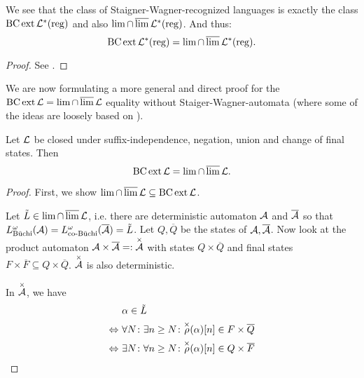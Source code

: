 \begin{theorem}
\label{thm:staiger-wagner}
We see that the class of Staigner-Wagner-recognized languages is exactly the class $\operatorname{BC} \operatorname{ext} \mathcal{L}^*(\textup{\textrm{reg}})$ and also $\lim \cap \operatorname{\overline{lim}} \mathcal{L}^*(\textup{\textrm{reg}})$. And thus:
\[ \operatorname{BC} \operatorname{ext} \mathcal{L}^*(\textup{\textrm{reg}}) = \lim \cap \operatorname{\overline{lim}} \mathcal{L}^*(\textup{\textrm{reg}}) . \]
\begin{proof}
See \cite[Theorem 63+64, p.44]{InfCompR101}.
\end{proof}
\end{theorem}

We are now formulating a more general and direct proof for the $\operatorname{BC} \operatorname{ext} \mathcal{L} = \lim \cap \operatorname{\overline{lim}} \mathcal{L}$ equality without Staiger-Wagner-automata (where some of the ideas are loosely based on \cite[Theorem 63+64, p.44]{InfCompR101}).

\begin{theorem}
\label{gen:staiger-wagner}
Let $\mathcal{L}$ be closed under suffix-independence, negation, union and change of final states. Then
\[ \operatorname{BC} \operatorname{ext} \mathcal{L} = \lim \cap \operatorname{\overline{lim}} \mathcal{L} . \]

\begin{proof}
First, we show $\lim \cap \operatorname{\overline{lim}} \mathcal{L} \subseteq \operatorname{BC} \operatorname{ext} \mathcal{L}$.

Let $\tilde L \in \lim \cap \operatorname{\overline{lim}} \mathcal{L}$, i.e. there are deterministic automaton $\mathcal{A}$ and $\overline {\mathcal{A}}$ so that $L^\omega_{\text{Büchi}}(\mathcal{A}) = L^\omega_{\text{co-Büchi}}(\overline {\mathcal{A}}) = \tilde L$. Let $Q,\overline Q$ be the states of $\mathcal{A},\overline {\mathcal{A}}$. Now look at the product automaton $\mathcal{A} \times \overline {\mathcal{A}} =: \overset{\times}{\mathcal{A}}$ with states $Q \times \overline Q$ and final states $F \times \overline F \subseteq Q \times \overline Q$. $\overset{\times}{\mathcal{A}}$ is also deterministic.



In $\overset{\times}{\mathcal{A}}$, we have
\begin{align*}
& \alpha \in \tilde L \\
\Leftrightarrow \ & \forall N \colon \exists n \ge N \colon \overset{\times}{\rho}(\alpha)[n] \in F \times \overline Q \\
\Leftrightarrow \ & \exists N \colon \forall n \ge N \colon \overset{\times}{\rho}(\alpha)[n] \in Q \times \overline F
\end{align*}


\end{proof}
\end{theorem}
